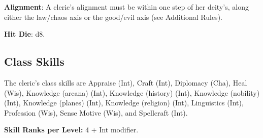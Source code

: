 \textbf{Alignment}: A cleric's alignment must be within one step of her deity's, along either the law/chaos axis
or the good/evil axis (see Additional Rules).

\textbf{Hit Die}: d8.

\subsection{Class Skills}


The cleric's class skills are Appraise (Int), Craft (Int), Diplomacy (Cha), Heal (Wis), Knowledge (arcana) (Int),
Knowledge (history) (Int), Knowledge (nobility) (Int), Knowledge (planes) (Int), Knowledge (religion) (Int),
Linguistics (Int), Profession (Wis), Sense Motive (Wis), and Spellcraft (Int).

\textbf{Skill Ranks per Level: }4 + Int modifier.

